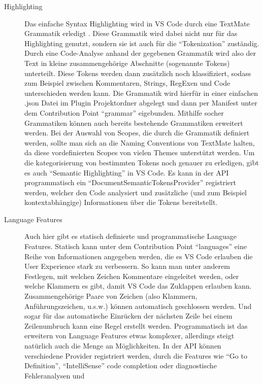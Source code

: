   \begin{description}
    \item[Highlighting] 
      Das einfache Syntax Highlighting wird in VS Code durch eine TextMate Grammatik erledigt \cite{TextMateGrammar}.
      Diese Grammatik wird dabei nicht nur für das Highlighting genutzt, sondern sie ist auch für die \enquote{Tokenization}
      zuständig. Durch eine Code-Analyse anhand der gegebenen Grammatik wird also der Text in kleine 
      zusammengehörige Abschnitte (sogenannte Tokens) unterteilt. Diese Tokens werden dann zusätzlich noch 
      klassifiziert, sodass zum Beispiel zwischen Kommentaren, Strings, RegExen und Code unterschieden werden kann.
      Die Grammatik wird hierfür in einer einfachen .json Datei im Plugin Projektordner abgelegt und dann per Manifest
      unter dem Contribution Point \enquote{grammar} eigebunden. Mithilfe socher Grammatiken können auch bereits bestehende
      Grammatiken erweitert werden. Bei der Auswahl von Scopes, die durch die Grammatik definiert werden, sollte man sich
      an die Naming Conventions von TextMate halten, da diese vordefinierten Scopes von vielen Themes unterstützt werden.
      Um die kategorisierung von bestimmten Tokens noch genauer zu erledigen, gibt es auch \enquote{Semantic Highlighting} 
      in VS Code. Es kann in der API programmatisch ein \enquote{DocumentSemanticTokensProvider} registriert werden,
      welcher den Code analysiert und zusätzliche (und zum Beispiel kontextabhängige) Informationen über die Tokens bereitstellt.
    \item[Language Features] 
      Auch hier gibt es statisch definierte und programmatische Language Features.
      Statisch kann unter dem Contribution Point \enquote{languages} eine Reihe von Informationen angegeben werden,
      die es VS Code erlauben die User Experience stark zu verbessern. So kann man unter anderem Festlegen,
      mit welchen Zeichen Kommentare eingeleitet werden, oder welche Klammern es gibt, damit VS Code das Zuklappen erlauben kann.
      Zusammengehörige Paare von Zeichen (also Klammern, Anführungszeichen, u.s.w.) können automatisch geschlossen werden.
      Und sogar für das automatische Einrücken der nächsten Zeile bei einem Zeilenumbruch kann eine Regel erstellt werden.
      Programmatisch ist das erweitern von Language Features etwas komplexer, allerdings steigt natürlich auch die
      Menge an Möglichkeiten. In der API können verschiedene Provider registriert werden, durch die Features wie
      \enquote{Go to Definition}, \enquote{IntelliSense} code completion oder diagnostische Fehleranalysen und

\end{description}
